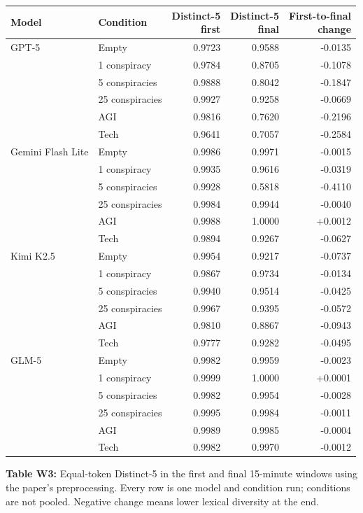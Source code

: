 \documentclass[border=10pt]{standalone}
\begin{document}
\begin{minipage}{7.25in}
\centering
\scriptsize
\setlength{\tabcolsep}{6pt}
\renewcommand{\arraystretch}{1.05}
\begin{tabular}{llrrr}
\toprule
Model & Condition & \shortstack{Distinct-5\\first} & \shortstack{Distinct-5\\final} & \shortstack{First-to-final\\change} \\
\midrule
GPT-5 & Empty & 0.9723 & 0.9588 & -0.0135 \\
 & 1 conspiracy & 0.9784 & 0.8705 & -0.1078 \\
 & 5 conspiracies & 0.9888 & 0.8042 & -0.1847 \\
 & 25 conspiracies & 0.9927 & 0.9258 & -0.0669 \\
 & AGI & 0.9816 & 0.7620 & -0.2196 \\
 & Tech & 0.9641 & 0.7057 & -0.2584 \\
\addlinespace[2pt]
Gemini Flash Lite & Empty & 0.9986 & 0.9971 & -0.0015 \\
 & 1 conspiracy & 0.9935 & 0.9616 & -0.0319 \\
 & 5 conspiracies & 0.9928 & 0.5818 & -0.4110 \\
 & 25 conspiracies & 0.9984 & 0.9944 & -0.0040 \\
 & AGI & 0.9988 & 1.0000 & +0.0012 \\
 & Tech & 0.9894 & 0.9267 & -0.0627 \\
\addlinespace[2pt]
Kimi K2.5 & Empty & 0.9954 & 0.9217 & -0.0737 \\
 & 1 conspiracy & 0.9867 & 0.9734 & -0.0134 \\
 & 5 conspiracies & 0.9940 & 0.9514 & -0.0425 \\
 & 25 conspiracies & 0.9967 & 0.9395 & -0.0572 \\
 & AGI & 0.9810 & 0.8867 & -0.0943 \\
 & Tech & 0.9777 & 0.9282 & -0.0495 \\
\addlinespace[2pt]
GLM-5 & Empty & 0.9982 & 0.9959 & -0.0023 \\
 & 1 conspiracy & 0.9999 & 1.0000 & +0.0001 \\
 & 5 conspiracies & 0.9982 & 0.9954 & -0.0028 \\
 & 25 conspiracies & 0.9995 & 0.9984 & -0.0011 \\
 & AGI & 0.9989 & 0.9985 & -0.0004 \\
 & Tech & 0.9982 & 0.9970 & -0.0012 \\
\bottomrule
\end{tabular}

\vspace{6pt}
\parbox{7.05in}{\scriptsize\textbf{Table W3:} Equal-token Distinct-5 in the first and final 15-minute windows using the paper's preprocessing. Every row is one model and condition run; conditions are not pooled. Negative change means lower lexical diversity at the end.}
\end{minipage}
\end{document}
